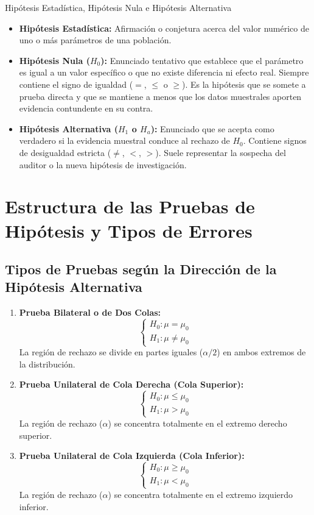 \begin{definicion}{Hipótesis Estadística, Hipótesis Nula e Hipótesis Alternativa}
\begin{itemize}
    \item \textbf{Hipótesis Estadística:} Afirmación o conjetura acerca del valor numérico de uno o más parámetros de una población.
    \item \textbf{Hipótesis Nula ($H_0$):} Enunciado tentativo que establece que el parámetro es igual a un valor específico o que no existe diferencia ni efecto real. Siempre contiene el signo de igualdad ($=$, $\le$ o $\ge$). Es la hipótesis que se somete a prueba directa y que se mantiene a menos que los datos muestrales aporten evidencia contundente en su contra.
    \item \textbf{Hipótesis Alternativa ($H_1$ o $H_a$):} Enunciado que se acepta como verdadero si la evidencia muestral conduce al rechazo de $H_0$. Contiene signos de desigualdad estricta ($\ne$, $<$, $>$). Suele representar la sospecha del auditor o la nueva hipótesis de investigación.
\end{itemize}
\end{definicion}

\section{Estructura de las Pruebas de Hipótesis y Tipos de Errores}

\subsection{Tipos de Pruebas según la Dirección de la Hipótesis Alternativa}
\begin{enumerate}
    \item \textbf{Prueba Bilateral o de Dos Colas:}
    \[
    \begin{cases} H_0: \mu = \mu_0 \\ H_1: \mu \ne \mu_0 \end{cases}
    \]
    La región de rechazo se divide en partes iguales ($\alpha/2$) en ambos extremos de la distribución.
    
    \item \textbf{Prueba Unilateral de Cola Derecha (Cola Superior):}
    \[
    \begin{cases} H_0: \mu \le \mu_0 \\ H_1: \mu > \mu_0 \end{cases}
    \]
    La región de rechazo ($\alpha$) se concentra totalmente en el extremo derecho superior.
    
    \item \textbf{Prueba Unilateral de Cola Izquierda (Cola Inferior):}
    \[
    \begin{cases} H_0: \mu \ge \mu_0 \\ H_1: \mu < \mu_0 \end{cases}
    \]
    La región de rechazo ($\alpha$) se concentra totalmente en el extremo izquierdo inferior.
\end{enumerate}

